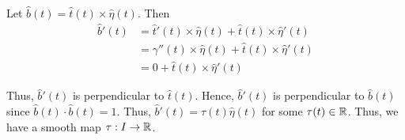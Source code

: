 Let $\hat{b} (t) = \hat{t} (t) \times \hat{\eta} (t)$. Then
\begin{align*}
    \hat{b} '(t) &= \hat{t} ' (t) \times \hat{\eta} (t) + \hat{t} (t) \times \hat{\eta} ' (t) \\
    &= \gamma '' (t) \times \hat{\eta} (t) + \hat{t} (t) \times \hat{\eta} ' (t) \\
    &= 0 +\hat{t} (t) \times \hat{\eta} ' (t)
\end{align*}

Thus, $\hat{b} ' (t) $ is perpendicular to $\hat{t} (t)$. Hence, $\hat{b} '(t)$ is perpendicular to $\hat{b} (t)$ since $\hat{b} (t) \cdot \hat{b} (t) =1$. Thus, $\hat{b} ' (t) = \tau (t) \hat{\eta} (t)$ for some $\tau (t) \in \mathbb R$. Thus, we have a smooth map $\tau : I \to \mathbb R$.
